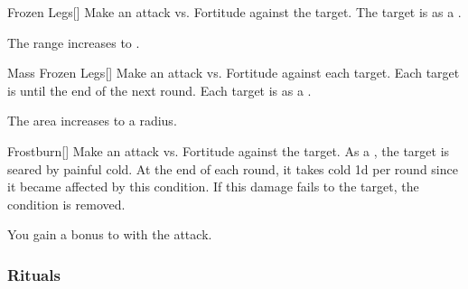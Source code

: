 \lowercase{\hypertarget{spell:Frozen Legs}{}}\label{spell:Frozen Legs}
\begin{freeability}[Rank 5]{\hypertarget{spell:Frozen Legs}{Frozen Legs}}[]
Make an attack vs. Fortitude against the target.
\hit The target is  as a .

\rankline
{} The range increases to \rngmed.

\end{freeability}
\vspace{0.25em}



\lowercase{\hypertarget{spell:Mass Frozen Legs}{}}\label{spell:Mass Frozen Legs}
\begin{freeability}[Rank 5]{\hypertarget{spell:Mass Frozen Legs}{Mass Frozen Legs}}[]
Make an attack vs. Fortitude against each target.
\hit Each target is  until the end of the next round.
\crit Each target is  as a .

\rankline
{} The area increases to a \areamed radius.

\end{freeability}
\vspace{0.25em}



\lowercase{\hypertarget{spell:Frostburn}{}}\label{spell:Frostburn}
\begin{freeability}[Rank 6]{\hypertarget{spell:Frostburn}{Frostburn}}[]
Make an attack vs. Fortitude against the target.
\hit As a , the target is seared by painful cold.
At the end of each round, it takes cold  \minus1d per round since it became affected by this condition.
If this damage fails to  the target, the condition is removed.

\rankline
{} You gain a  bonus to  with the attack.

\end{freeability}
\vspace{0.25em}



\subsubsection{Rituals}


